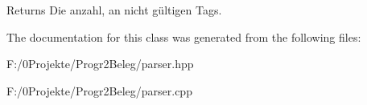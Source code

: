 \begin{DoxyReturn}{Returns}
Die anzahl, an nicht gültigen Tags. 
\end{DoxyReturn}


The documentation for this class was generated from the following files\-:\begin{DoxyCompactItemize}
\item 
F\-:/0\-Projekte/\-Progr2\-Beleg/parser.\-hpp\item 
F\-:/0\-Projekte/\-Progr2\-Beleg/parser.\-cpp\end{DoxyCompactItemize}
